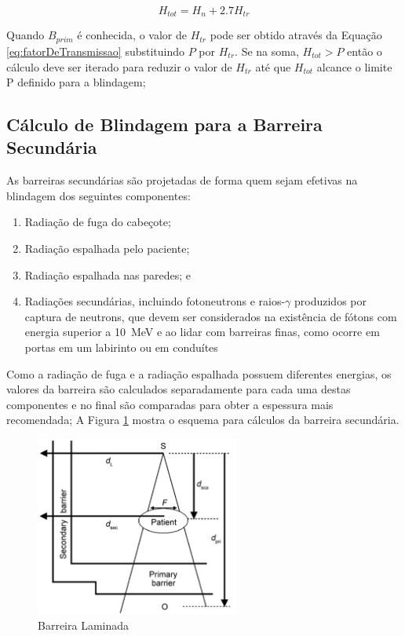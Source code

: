 \documentclass[11pt,a4paper]{article}
\begin{document}
            \begin{equation}
                H_{tot} = H_n + 2.7 H_{tr}
            \end{equation}

            Quando $B_{prim}$ é conhecida, o valor de $H_{tr}$ pode ser obtido através da Equação \ref{eq:fatorDeTransmissao} substituindo $P$ por $H_{tr}$. Se na soma,  $H_{tot} > P$ então o cálculo deve ser iterado para reduzir o valor de $H_{tr}$ até que $H_{tot}$ alcance o limite P definido para a blindagem;

        \subsection{Cálculo de Blindagem para a Barreira Secundária}

            As barreiras secundárias são projetadas de forma quem sejam efetivas na blindagem dos seguintes componentes:

                \begin{enumerate}
                    \item Radiação de fuga do cabeçote;
                    \item Radiação espalhada pelo paciente;
                    \item Radiação espalhada nas paredes; e 
                    \item Radiações secundárias, incluindo fotoneutrons e raios-$\gamma$ produzidos por captura de neutrons, que devem ser considerados na existência de fótons com energia superior a \qty{10}{MeV} e ao lidar com barreiras finas, como ocorre em portas em um labirinto ou em conduítes 
                \end{enumerate}

            Como a radiação de fuga e a radiação espalhada possuem diferentes energias, os valores da barreira são calculados separadamente para cada uma destas componentes e no final são comparadas para obter a espessura mais recomendada; A Figura \ref{fig:esquemaTransmissaoRadiacaoEspalhadaPaciente} mostra o esquema para cálculos da barreira secundária. 

            \begin{figure}[h]
                \centering
                \includegraphics[width=0.6\textwidth]{Imagens/esquemaTransmissaoRadiacaoEspalhadaPaciente.JPG}
                \caption{Barreira Laminada}
                \label{fig:esquemaTransmissaoRadiacaoEspalhadaPaciente}
            \end{figure}
\end{document}
